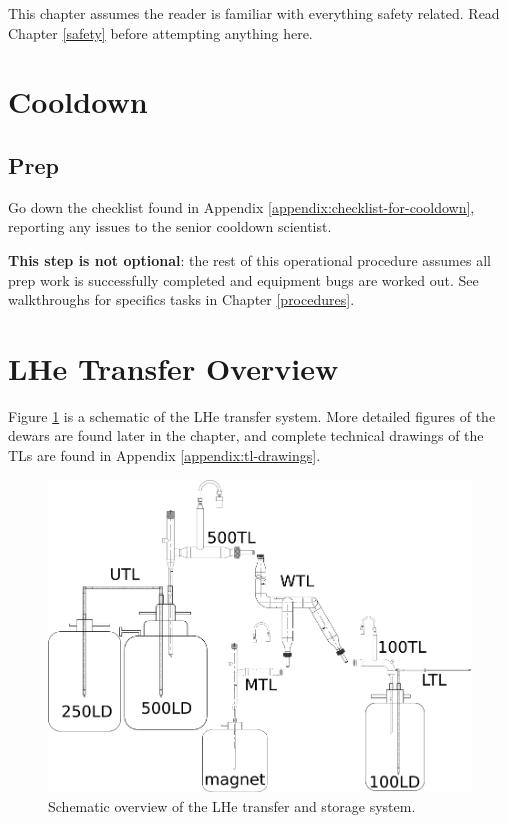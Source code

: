 This chapter assumes the reader is familiar with everything safety related.  Read Chapter \ref{safety} before attempting anything here.



\section{Cooldown}
\subsection{Prep}
\label{practical-op:prep}
Go down the checklist found in Appendix \ref{appendix:checklist-for-cooldown}, reporting any issues to the senior cooldown scientist.

\textbf{This step is not optional}: the rest of this operational procedure assumes all prep work is successfully completed and equipment bugs are worked out.  See walkthroughs for specifics tasks in Chapter \ref{procedures}.

\section{LHe Transfer Overview}

Figure \ref{fig:cryo-schematic-all} is a schematic of the LHe transfer system.  More detailed figures of the dewars are found later in the chapter, and complete technical drawings of the TLs are found in Appendix \ref{appendix:tl-drawings}.

\begin{figure}[htbp!]
 \centering
 \includegraphics[width=\textwidth]{./img/cryo-schematic-all.png}
 \caption{Schematic overview of the LHe transfer and storage system.}
 \label{fig:cryo-schematic-all}
\end{figure}


